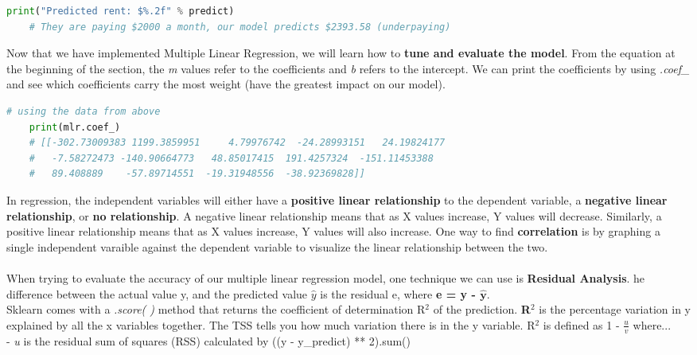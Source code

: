 \documentclass[11pt, a4paper]{article}
\begin{document}
\begin{spacing}{1.1}
\begin{lstlisting}[language=Python]
	print("Predicted rent: $%.2f" % predict)
	# They are paying $2000 a month, our model predicts $2393.58 (underpaying)	\end{lstlisting} \newpage
	\noindent Now that we have implemented Multiple Linear Regression, we will learn how to \textbf{tune and evaluate the model}. From the equation at the beginning of the section, the \textit{m} values refer to the coefficients and \textit{b} refers to the intercept. We can print the coefficients by using \textit{.coef\_} and see which coefficients carry the most weight (have the greatest impact on our model).
	\begin{lstlisting}[language=Python]
	# using the data from above
	print(mlr.coef_)
	# [[-302.73009383 1199.3859951     4.79976742  -24.28993151   24.19824177
	#   -7.58272473 -140.90664773   48.85017415  191.4257324  -151.11453388
	#   89.408889    -57.89714551  -19.31948556  -38.92369828]]	\end{lstlisting}\vspace*{1mm}
	In regression, the independent variables will either have a \textbf{positive linear relationship} to the dependent variable, a \textbf{negative linear relationship}, or \textbf{no relationship}. A negative linear relationship means that as X values increase, Y values will decrease. Similarly, a positive linear relationship means that as X values increase, Y values will also increase. One way to find \textbf{correlation} is by graphing a single independent varaible against the dependent variable to visualize the linear relationship between the two. \\~\\
	When trying to evaluate the accuracy of our multiple linear regression model, one technique we can use is \textbf{Residual Analysis}. he difference between the actual value y, and the predicted value $\hat{y}$ is the residual e, where \textbf{e = y - $\mathbf{\hat{y}}$}. \vspace*{1.5mm} \\
	Sklearn comes with a \textit{.score( )} method that returns the coefficient of determination R$^2$ of the prediction. \textbf{R$^2$} is the percentage variation in y explained by all the x variables together. The TSS tells you how much variation there is in the y variable. R$^2$ is defined as 1 - $\frac{u}{v}$ where... \vspace*{1mm} \\
	\hspace*{2mm} - \textit{u} is the residual sum of squares (RSS) calculated by ((y - y\_predict) ** 2).sum() \\

\end{spacing}
\end{document}
